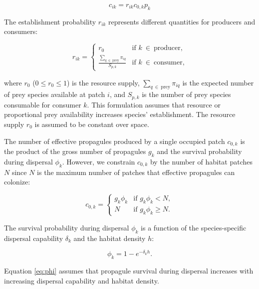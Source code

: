 \documentclass[11pt, class=article, crop=false]{standalone}
\begin{document}
\begin{equation}
     c_{ik} = r_{ik} c_{0, k} p_k
\end{equation}

The establishment probability $r_{ik}$ represents different quantities for producers and consumers:

\begin{equation}
    r_{ik} =
    \begin{cases}
    r_{0} & \text{if $k~\in~\text{producer}$,}\\
    \frac{\sum_{q~\in~\text{prey}} \pi_{iq}}{S_{p, k}} & \text{if $k~\in~\text{consumer}$,}
    \end{cases}
    \label{eq:r-eq}
\end{equation}

where $r_0$ ($0 \le r_0 \le 1$) is the resource supply, $\sum_{q~\in~\text{prey}} \pi_{iq}$ is the expected number of prey species available at patch $i$, and $S_{p, k}$ is the number of prey species consumable for consumer $k$.
This formulation assumes that resource or proportional prey availability increases species' establishment.
The resource supply $r_0$ is assumed to be constant over space.

The number of effective propagules produced by a single occupied patch $c_{0, k}$ is the product of the gross number of propagules $g_{k}$ and the survival probability during dispersal $\phi_k$.
However, we constrain $c_{0, k}$ by the number of habitat patches $N$ since $N$ is the maximum number of patches that effective propagules can colonize:

\begin{equation}
    c_{0, k} = 
    \begin{cases}
        g_k \phi_k & \text{if $g_k \phi_k < N$},\\
        N & \text{if $g_k \phi_k \ge N$}.
    \end{cases}
    \label{eq:c0-prod}
\end{equation}

The survival probability during dispersal $\phi_k$ is a function of the species-specific dispersal capability $\delta_k$ and the habitat density $h$:

\begin{equation}
    \phi_k = 1 - e^{-\delta_k h}.
    \label{eq:phi}
\end{equation}

Equation \ref{eq:phi} assumes that propagule survival during dispersal increases with increasing dispersal capability and habitat density.
\end{document}
